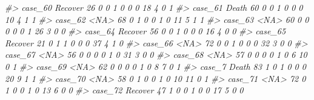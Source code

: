 \documentclass[]{book}
\newenvironment{Shaded}{\begin{snugshade}}{\end{snugshade}}
\newcommand{\CommentTok}[1]{\textcolor[rgb]{0.56,0.35,0.01}{\textit{#1}}}
\begin{document}
\begin{Shaded}
\begin{Highlighting}[]
\CommentTok{#> case_60  Recover  26        0        0                1                 0                 0              0                    18                      4           0             1}
\CommentTok{#> case_61    Death  60        0        0                1                 0                 0              0                    10                      4           1             1}
\CommentTok{#> case_62     <NA>  68        0        1                0                 0                 1              0                    11                      5           1             1}
\CommentTok{#> case_63     <NA>  60        0        0                0                 0                 0              1                    26                      3           0             0}
\CommentTok{#> case_64  Recover  56        0        0                1                 0                 0              0                    16                      4           0             0}
\CommentTok{#> case_65  Recover  21        0        1                1                 0                 0              0                    37                      4           1             0}
\CommentTok{#> case_66     <NA>  72        0        0                1                 0                 0              0                    32                      3           0             0}
\CommentTok{#> case_67     <NA>  56        0        0                0                 0                 1              0                    31                      3           0             0}
\CommentTok{#> case_68     <NA>  57        0        0                0                 0                 1              0                     6                     10           0             1}
\CommentTok{#> case_69     <NA>  62        0        0                0                 0                 1              0                     8                      7           0             1}
\CommentTok{#> case_7     Death  83        1        0                1                 0                 0              0                    20                      9           1             1}
\CommentTok{#> case_70     <NA>  58        0        1                0                 0                 1              0                    10                     11           0             1}
\CommentTok{#> case_71     <NA>  72        0        1                0                 0                 1              0                    13                      6           0             0}
\CommentTok{#> case_72  Recover  47        1        0                0                 1                 0              0                    17                      5           0             0}

\end{Highlighting}
\end{Shaded}
\end{document}
